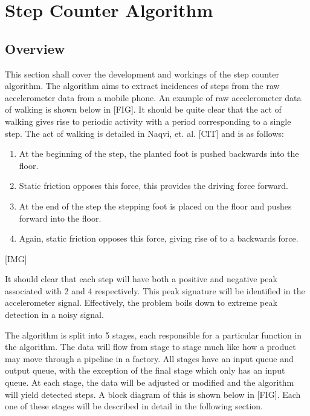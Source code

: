 \part{Step Counter Algorithm}

    \chapter{Overview}

        This section shall cover the development and workings of the step counter algorithm. The algorithm aims to extract incidences of steps from the raw accelerometer data from a mobile phone. An example of raw accelerometer data of walking is shown below in [FIG]. It should be quite clear that the act of walking gives rise to periodic activity with a period corresponding to a single step. The act of walking is detailed in Naqvi, et. al. [CIT] and is as follows:

        \begin{enumerate}
            \item At the beginning of the step, the planted foot is pushed backwards into the floor.
            \item Static friction opposes this force, this provides the driving force forward.
            \item At the end of the step the stepping foot is placed on the floor and pushes forward into the floor.
            \item Again, static friction opposes this force, giving rise of to a backwards force.
        \end{enumerate}

        [IMG]

        It should clear that each step will have both a positive and negative peak associated with 2 and 4 respectively. This peak signature will be identified in the accelerometer signal. Effectively, the problem boils down to extreme peak detection in a noisy signal. 

        The algorithm is split into 5 stages, each responsible for a particular function in the algorithm. The data will flow from stage to stage much like how a product may move through a pipeline in a factory. All stages have an input queue and output queue, with the exception of the final stage which only has an input queue. At each stage, the data will be adjusted or modified and the algorithm will yield detected steps. A block diagram of this is shown below in [FIG]. Each one of these stages will be described in detail in the following section.


